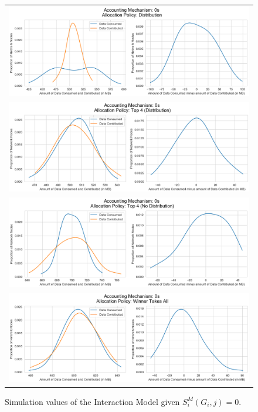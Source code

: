 \begin{figure}[H]
\begin{center}
\begin{tabular}{c}
\includegraphics[scale=0.8]{Acc_0s_Dist.png} \\ 
\includegraphics[scale=0.8]{Acc_0s_Top_4_Dist.png} \\
\includegraphics[scale=0.8]{Acc_0s_Top_4_No_Dist.png} \\
\includegraphics[scale=0.8]{Acc_0s_Winner.png} \\
\end{tabular}
\caption{Simulation values of the Interaction Model given $S^M_i(G_i,j)=0$.}
\label{fig:Acc_0s_Sim_Values}
\end{center}
\end{figure}

